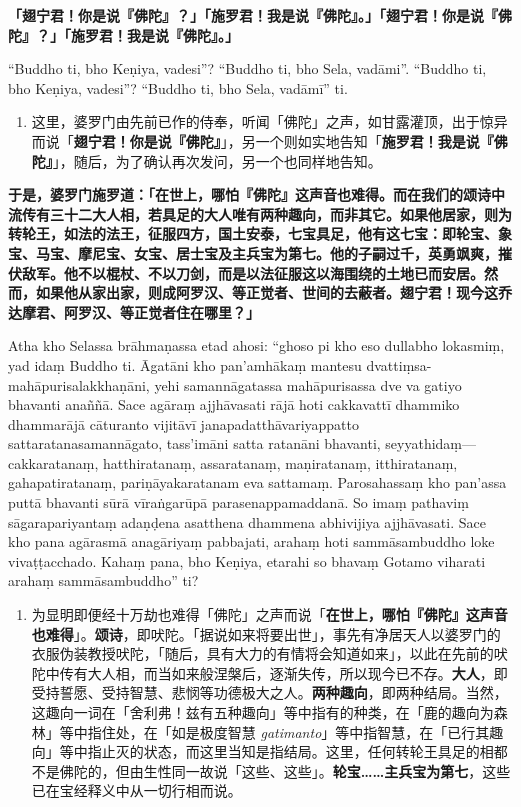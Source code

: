 \textbf{「翅宁君！你是说『佛陀』？」「施罗君！我是说『佛陀』。」「翅宁君！你是说『佛陀』？」「施罗君！我是说『佛陀』。」}

“Buddho ti, bho Keṇiya, vadesi”? “Buddho ti, bho Sela, vadāmi”. “Buddho ti, bho Keṇiya, vadesi”? “Buddho ti, bho Sela, vadāmī” ti.

\begin{enumerate}\item 这里，婆罗门由先前已作的侍奉，听闻「佛陀」之声，如甘露灌顶，出于惊异而说「\textbf{翅宁君！你是说『佛陀』}」，另一个则如实地告知「\textbf{施罗君！我是说『佛陀』}」，随后，为了确认再次发问，另一个也同样地告知。\end{enumerate}

\textbf{于是，婆罗门施罗道：「在世上，哪怕『佛陀』这声音也难得。而在我们的颂诗中流传有三十二大人相，若具足的大人唯有两种趣向，而非其它。如果他居家，则为转轮王，如法的法王，征服四方，国土安泰，七宝具足，他有这七宝：即轮宝、象宝、马宝、摩尼宝、女宝、居士宝及主兵宝为第七。他的子嗣过千，英勇飒爽，摧伏敌军。他不以棍杖、不以刀剑，而是以法征服这以海围绕的土地已而安居。然而，如果他从家出家，则成阿罗汉、等正觉者、世间的去蔽者。翅宁君！现今这乔达摩君、阿罗汉、等正觉者住在哪里？」}

Atha kho Selassa brāhmaṇassa etad ahosi: “ghoso pi kho eso dullabho lokasmiṃ, yad idaṃ Buddho ti. Āgatāni kho pan’amhākaṃ mantesu dvattiṃsa-mahāpurisalakkhaṇāni, yehi samannāgatassa mahāpurisassa dve va gatiyo bhavanti anaññā. Sace agāraṃ ajjhāvasati rājā hoti cakkavattī dhammiko dhammarājā cāturanto vijitāvī janapadatthāvariyappatto sattaratanasamannāgato, tass’imāni satta ratanāni bhavanti, seyyathidaṃ— cakkaratanaṃ, hatthiratanaṃ, assaratanaṃ, maṇiratanaṃ, itthiratanaṃ, gahapatiratanaṃ, pariṇāyakaratanam eva sattamaṃ. Parosahassaṃ kho pan’assa puttā bhavanti sūrā vīraṅgarūpā parasenappamaddanā. So imaṃ pathaviṃ sāgarapariyantaṃ adaṇḍena asatthena dhammena abhivijiya ajjhāvasati. Sace kho pana agārasmā anagāriyaṃ pabbajati, arahaṃ hoti sammāsambuddho loke vivaṭṭacchado. Kahaṃ pana, bho Keṇiya, etarahi so bhavaṃ Gotamo viharati arahaṃ sammāsambuddho” ti?

\begin{enumerate}\item 为显明即便经十万劫也难得「佛陀」之声而说「\textbf{在世上，哪怕『佛陀』这声音也难得}」。\textbf{颂诗}，即吠陀。「据说如来将要出世」，事先有净居天人以婆罗门的衣服伪装教授吠陀，「随后，具有大力的有情将会知道如来」，以此在先前的吠陀中传有大人相，而当如来般涅槃后，逐渐失传，所以现今已不存。\textbf{大人}，即受持誓愿、受持智慧、悲悯等功德极大之人。\textbf{两种趣向}，即两种结局。当然，这趣向一词在「舍利弗！兹有五种趣向」等中指有的种类，在「鹿的趣向为森林」等中指住处，在「如是极度智慧 \textit{gatimanto}」等中指智慧，在「已行其趣向」等中指止灭的状态，而这里当知是指结局。这里，任何转轮王具足的相都不是佛陀的，但由生性同一故说「这些、这些」。\textbf{轮宝……主兵宝为第七}，这些已在宝经释义中从一切行相而说。\end{enumerate}

